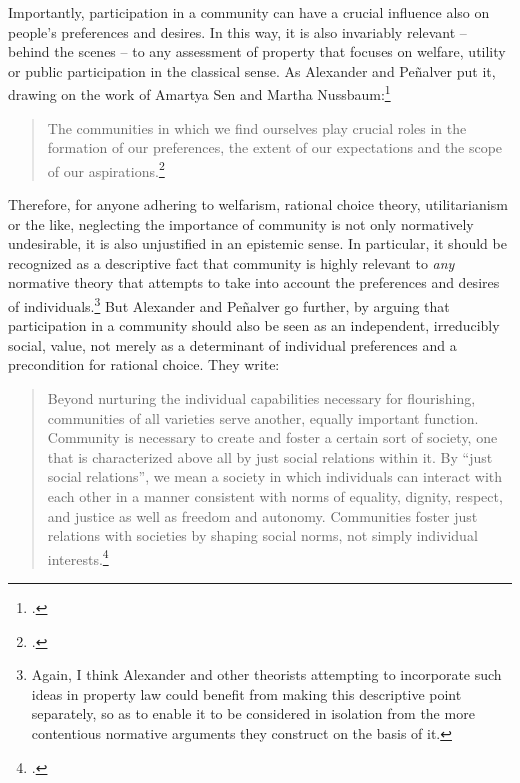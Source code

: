 Importantly, participation in a community can have a crucial influence also on people's preferences and desires. In this way, it is also invariably relevant -- behind the scenes -- to any assessment of property that focuses on welfare, utility or public participation in the classical sense. As Alexander and Pe\~{n}alver put it, drawing on the work of Amartya Sen and Martha Nussbaum:\footcite{sen84,sen85,sen99,nussbaum00,nussbaum02}
\begin{quote}
The communities in which we find ourselves play crucial roles in the formation of our preferences, the extent of our expectations and the scope of our aspirations.\footcite[140]{alexander09}
\end{quote}
Therefore, for anyone adhering to welfarism, rational choice theory, utilitarianism or the like, neglecting the importance of community is not only normatively undesirable, it is also unjustified in an epistemic sense. In particular, it should be recognized as a descriptive fact that community is highly relevant to {\it any} normative theory that attempts to take into account the preferences and desires of individuals.\footnote{Again, I think Alexander and other theorists attempting to incorporate such ideas in property law could benefit from making this descriptive point separately, so as to enable it to be considered in isolation from the more contentious normative arguments they construct on the basis of it.} But Alexander and Pe\~{n}alver go further, by arguing that participation in a community should also be seen as an independent, irreducibly social, value, not merely as a determinant of individual preferences and a precondition for rational choice. They write:

\begin{quote}
Beyond nurturing the individual capabilities necessary for flourishing, communities of all varieties serve another, equally important function. Community is necessary to create and foster a certain sort of society, one that is characterized above all by just social relations within it. By ``just social relations'', we mean a society in which individuals can interact with each other in a manner consistent with norms of equality, dignity, respect, and justice as well as freedom and autonomy. Communities foster just relations with societies by shaping social norms, not simply individual interests.\footcite[140]{alexander09}
\end{quote}

